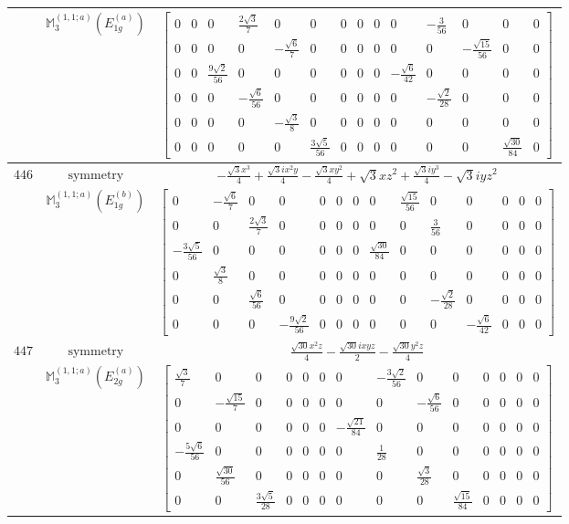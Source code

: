 \documentclass[fleqn,8pt,landscape]{jsarticle}
\begin{document}
\begin{longtable}{ccc}
$  $ & $ \mathbb{M}_{3}^{(1,1;a)}(E_{1g}^{(a)}) $ & $ \begin{bmatrix} 0 & 0 & 0 & \frac{2 \sqrt{3}}{7} & 0 & 0 & 0 & 0 & 0 & 0 & - \frac{3}{56} & 0 & 0 & 0 \\ 0 & 0 & 0 & 0 & - \frac{\sqrt{6}}{7} & 0 & 0 & 0 & 0 & 0 & 0 & - \frac{\sqrt{15}}{56} & 0 & 0 \\ 0 & 0 & \frac{9 \sqrt{2}}{56} & 0 & 0 & 0 & 0 & 0 & 0 & - \frac{\sqrt{6}}{42} & 0 & 0 & 0 & 0 \\ 0 & 0 & 0 & - \frac{\sqrt{6}}{56} & 0 & 0 & 0 & 0 & 0 & 0 & - \frac{\sqrt{2}}{28} & 0 & 0 & 0 \\ 0 & 0 & 0 & 0 & - \frac{\sqrt{3}}{8} & 0 & 0 & 0 & 0 & 0 & 0 & 0 & 0 & 0 \\ 0 & 0 & 0 & 0 & 0 & \frac{3 \sqrt{5}}{56} & 0 & 0 & 0 & 0 & 0 & 0 & \frac{\sqrt{30}}{84} & 0 \end{bmatrix} $ \\ \hline
$ 446 $ & $ \text{symmetry} $ & $ - \frac{\sqrt{3} x^{3}}{4} + \frac{\sqrt{3} i x^{2} y}{4} - \frac{\sqrt{3} x y^{2}}{4} + \sqrt{3} x z^{2} + \frac{\sqrt{3} i y^{3}}{4} - \sqrt{3} i y z^{2} $ \\
$  $ & $ \mathbb{M}_{3}^{(1,1;a)}(E_{1g}^{(b)}) $ & $ \begin{bmatrix} 0 & - \frac{\sqrt{6}}{7} & 0 & 0 & 0 & 0 & 0 & 0 & \frac{\sqrt{15}}{56} & 0 & 0 & 0 & 0 & 0 \\ 0 & 0 & \frac{2 \sqrt{3}}{7} & 0 & 0 & 0 & 0 & 0 & 0 & \frac{3}{56} & 0 & 0 & 0 & 0 \\ - \frac{3 \sqrt{5}}{56} & 0 & 0 & 0 & 0 & 0 & 0 & \frac{\sqrt{30}}{84} & 0 & 0 & 0 & 0 & 0 & 0 \\ 0 & \frac{\sqrt{3}}{8} & 0 & 0 & 0 & 0 & 0 & 0 & 0 & 0 & 0 & 0 & 0 & 0 \\ 0 & 0 & \frac{\sqrt{6}}{56} & 0 & 0 & 0 & 0 & 0 & 0 & - \frac{\sqrt{2}}{28} & 0 & 0 & 0 & 0 \\ 0 & 0 & 0 & - \frac{9 \sqrt{2}}{56} & 0 & 0 & 0 & 0 & 0 & 0 & - \frac{\sqrt{6}}{42} & 0 & 0 & 0 \end{bmatrix} $ \\ \hline
$ 447 $ & $ \text{symmetry} $ & $ \frac{\sqrt{30} x^{2} z}{4} - \frac{\sqrt{30} i x y z}{2} - \frac{\sqrt{30} y^{2} z}{4} $ \\
$  $ & $ \mathbb{M}_{3}^{(1,1;a)}(E_{2g}^{(a)}) $ & $ \begin{bmatrix} \frac{\sqrt{3}}{7} & 0 & 0 & 0 & 0 & 0 & 0 & - \frac{3 \sqrt{2}}{56} & 0 & 0 & 0 & 0 & 0 & 0 \\ 0 & - \frac{\sqrt{15}}{7} & 0 & 0 & 0 & 0 & 0 & 0 & - \frac{\sqrt{6}}{56} & 0 & 0 & 0 & 0 & 0 \\ 0 & 0 & 0 & 0 & 0 & 0 & - \frac{\sqrt{21}}{84} & 0 & 0 & 0 & 0 & 0 & 0 & 0 \\ - \frac{5 \sqrt{6}}{56} & 0 & 0 & 0 & 0 & 0 & 0 & \frac{1}{28} & 0 & 0 & 0 & 0 & 0 & 0 \\ 0 & \frac{\sqrt{30}}{56} & 0 & 0 & 0 & 0 & 0 & 0 & \frac{\sqrt{3}}{28} & 0 & 0 & 0 & 0 & 0 \\ 0 & 0 & \frac{3 \sqrt{5}}{28} & 0 & 0 & 0 & 0 & 0 & 0 & \frac{\sqrt{15}}{84} & 0 & 0 & 0 & 0 \end{bmatrix} $ \\ \hline

\end{longtable}
\end{document}
